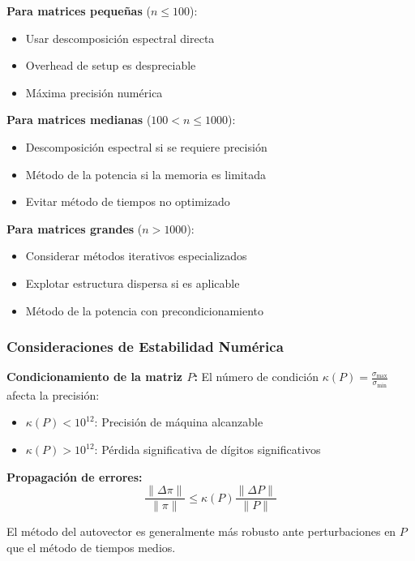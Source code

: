 \textbf{Para matrices pequeñas} ($n \leq 100$):
\begin{itemize}
\item Usar descomposición espectral directa
\item Overhead de setup es despreciable
\item Máxima precisión numérica
\end{itemize}

\textbf{Para matrices medianas} ($100 < n \leq 1000$):
\begin{itemize}
\item Descomposición espectral si se requiere precisión
\item Método de la potencia si la memoria es limitada
\item Evitar método de tiempos no optimizado
\end{itemize}

\textbf{Para matrices grandes} ($n > 1000$):
\begin{itemize}
\item Considerar métodos iterativos especializados
\item Explotar estructura dispersa si es aplicable
\item Método de la potencia con precondicionamiento
\end{itemize}

\subsubsection{Consideraciones de Estabilidad Numérica}

\textbf{Condicionamiento de la matriz $P$:}
El número de condición $\kappa(P) = \frac{\sigma_{\max}}{\sigma_{\min}}$ afecta la precisión:

\begin{itemize}
\item $\kappa(P) < 10^{12}$: Precisión de máquina alcanzable
\item $\kappa(P) > 10^{12}$: Pérdida significativa de dígitos significativos
\end{itemize}

\textbf{Propagación de errores:}
\begin{equation}
\frac{\|\Delta \pi\|}{\|\pi\|} \leq \kappa(P) \frac{\|\Delta P\|}{\|P\|}
\end{equation}

El método del autovector es generalmente más robusto ante perturbaciones en $P$ que el método de tiempos medios.
